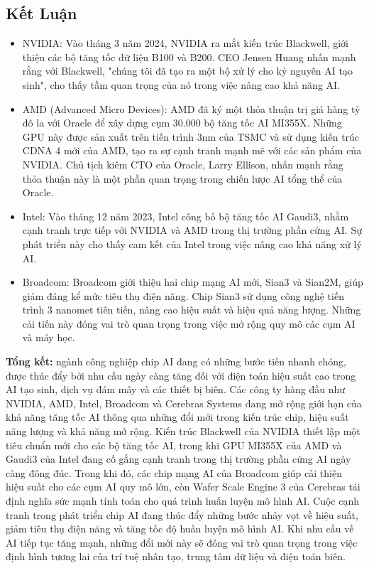 \documentclass[a4paper]{article}
\begin{document}
\subsection{Kết Luận}
\begin{itemize}
    \item NVIDIA: Vào tháng 3 năm 2024, NVIDIA ra mắt kiến trúc Blackwell, giới thiệu các bộ tăng tốc dữ liệu B100 và B200. CEO Jensen Huang nhấn mạnh rằng với Blackwell, "chúng tôi đã tạo ra một bộ xử lý cho kỷ nguyên AI tạo sinh", cho thấy tầm quan trọng của nó trong việc nâng cao khả năng AI.
    \item AMD (Advanced Micro Devices): AMD đã ký một thỏa thuận trị giá hàng tỷ đô la với Oracle để xây dựng cụm 30.000 bộ tăng tốc AI MI355X. Những GPU này được sản xuất trên tiến trình 3nm của TSMC và sử dụng kiến trúc CDNA 4 mới của AMD, tạo ra sự cạnh tranh mạnh mẽ với các sản phẩm của NVIDIA. Chủ tịch kiêm CTO của Oracle, Larry Ellison, nhấn mạnh rằng thỏa thuận này là một phần quan trọng trong chiến lược AI tổng thể của Oracle.
    \item Intel: Vào tháng 12 năm 2023, Intel công bố bộ tăng tốc AI Gaudi3, nhằm cạnh tranh trực tiếp với NVIDIA và AMD trong thị trường phần cứng AI. Sự phát triển này cho thấy cam kết của Intel trong việc nâng cao khả năng xử lý AI.
    \item Broadcom: Broadcom giới thiệu hai chip mạng AI mới, Sian3 và Sian2M, giúp giảm đáng kể mức tiêu thụ điện năng. Chip Sian3 sử dụng công nghệ tiến trình 3 nanomet tiên tiến, nâng cao hiệu suất và hiệu quả năng lượng. Những cải tiến này đóng vai trò quan trọng trong việc mở rộng quy mô các cụm AI và máy học.
\end{itemize}

\textbf{Tổng kết:} ngành công nghiệp chip AI đang có những bước tiến nhanh chóng, được thúc đẩy bởi nhu cầu ngày càng tăng đối với điện toán hiệu suất cao trong AI tạo sinh, dịch vụ đám mây và các thiết bị biên. Các công ty hàng đầu như NVIDIA, AMD, Intel, Broadcom và Cerebras Systems đang mở rộng giới hạn của khả năng tăng tốc AI thông qua những đổi mới trong kiến trúc chip, hiệu suất năng lượng và khả năng mở rộng.
Kiến trúc Blackwell của NVIDIA thiết lập một tiêu chuẩn mới cho các bộ tăng tốc AI, trong khi GPU MI355X của AMD và Gaudi3 của Intel đang cố gắng cạnh tranh trong thị trường phần cứng AI ngày càng đông đúc. Trong khi đó, các chip mạng AI của Broadcom giúp cải thiện hiệu suất cho các cụm AI quy mô lớn, còn Wafer Scale Engine 3 của Cerebras tái định nghĩa sức mạnh tính toán cho quá trình huấn luyện mô hình AI.
Cuộc cạnh tranh trong phát triển chip AI đang thúc đẩy những bước nhảy vọt về hiệu suất, giảm tiêu thụ điện năng và tăng tốc độ huấn luyện mô hình AI. Khi nhu cầu về AI tiếp tục tăng mạnh, những đổi mới này sẽ đóng vai trò quan trọng trong việc định hình tương lai của trí tuệ nhân tạo, trung tâm dữ liệu và điện toán biên.
\end{document}
